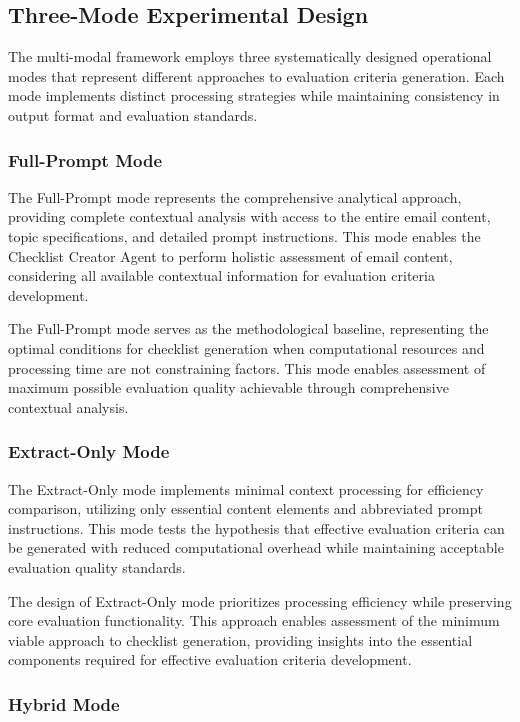 \subsection{Three-Mode Experimental Design}

The multi-modal framework employs three systematically designed operational modes that represent different approaches to evaluation criteria generation. Each mode implements distinct processing strategies while maintaining consistency in output format and evaluation standards.

\subsubsection{Full-Prompt Mode}

The Full-Prompt mode represents the comprehensive analytical approach, providing complete contextual analysis with access to the entire email content, topic specifications, and detailed prompt instructions. This mode enables the Checklist Creator Agent to perform holistic assessment of email content, considering all available contextual information for evaluation criteria development.

The Full-Prompt mode serves as the methodological baseline, representing the optimal conditions for checklist generation when computational resources and processing time are not constraining factors. This mode enables assessment of maximum possible evaluation quality achievable through comprehensive contextual analysis.

\subsubsection{Extract-Only Mode}

The Extract-Only mode implements minimal context processing for efficiency comparison, utilizing only essential content elements and abbreviated prompt instructions. This mode tests the hypothesis that effective evaluation criteria can be generated with reduced computational overhead while maintaining acceptable evaluation quality standards.

The design of Extract-Only mode prioritizes processing efficiency while preserving core evaluation functionality. This approach enables assessment of the minimum viable approach to checklist generation, providing insights into the essential components required for effective evaluation criteria development.

\subsubsection{Hybrid Mode}

